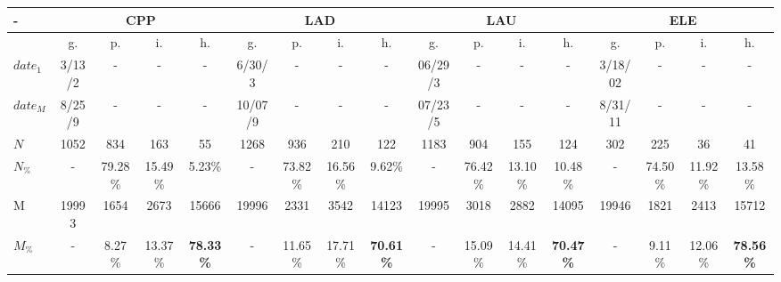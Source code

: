 \documentclass[%
 aip,
 jmp,%
 amsmath,amssymb,
 reprint,%
]{revtex4-1}
\begin{document}
\begin{table}
\footnotesize
  \centering
\setlength{\tabcolsep}{.056667em}
  \begin{tabular}{|l|| c|c|c|c||  c|c|c|c||   c|c|c|c||   c|c|c|c|}\hline
-\-  & \multicolumn{4}{c|}{CPP} & \multicolumn{4}{c|}{LAD} & \multicolumn{4}{c|}{LAU} & \multicolumn{4}{c|}{ELE} \\ \hline
 & g. & p. & i. & h. &     g. & p. & i. & h. &    g. & p. & i. & h. &    g. & p. & i. & h. \\\hline
$date_1$                     & 3/13/2 &  - &  - &  - &  6/30/3 &  - &  - &  - & 06/29/3 &  - &  - &  - & 3/18/02 &  - &  - &  - \\
$date_M$                     & 8/25/9 &  - &  - &  - & 10/07/9 &  - &  - &  - & 07/23/5 &  - &  - &  - & 8/31/11 &  - &  - &  -    \\\hline
$N$  & 1052 & 834 & 163 & 55 & 1268 & 936 & 210 & 122 & 1183 & 904 & 155 & 124 & 302 & 225 & 36 & 41 \\
$N_{\%}$  & - & 79.28\% & 15.49\% & 5.23\% & - & 73.82\% & 16.56\% & 9.62\% & - & 76.42\% & 13.10\% & 10.48\% & - & 74.50\% & 11.92\% & 13.58\% \\\hline
M  & 19993 & 1654 & 2673 & 15666 & 19996 & 2331 & 3542 & 14123 & 19995 & 3018 & 2882 & 14095 & 19946 & 1821 & 2413 & 15712 \\
$M_{\%}$  & - & 8.27\% & 13.37\% & {\bf 78.33\%} & - & 11.65\% & 17.71\% & {\bf 70.61\%} & - & 15.09\% & 14.41\% & {\bf 70.47\%} & - & 9.11\% & 12.06\% & {\bf 78.56\%} \\\hline

\end{tabular}
\end{table}
\end{document}
